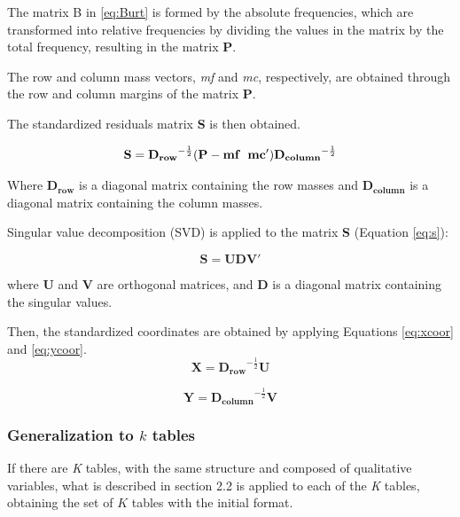 \documentclass[mathematics,article,submit,moreauthors,pdftex]{mdpi}
\begin{document}
The matrix B in \ref{eq:Burt} is formed by the absolute frequencies,
which are transformed into relative frequencies by dividing the values
in the matrix by the total frequency, resulting in the matrix
\textbf{P}.

The row and column mass vectors, \emph{mf} and \emph{mc}, respectively,
are obtained through the row and column margins of the matrix
\textbf{P}.

The standardized residuals matrix \textbf{S} is then obtained.

\begin{equation}
\mathbf{S}=\mathbf{D_{row}}^{-\frac{1}{2}}(\mathbf{P}-\mathbf{mf} \hspace{0.2cm} \mathbf{mc'})\mathbf{D_{column}}^{-\frac{1}{2}}
\label{eq:s}
\end{equation}

Where \(\mathbf{D_{row}}\) is a diagonal matrix containing the row
masses and \(\mathbf{D_{column}}\) is a diagonal matrix containing the
column masses.

Singular value decomposition (SVD) is applied to the matrix \textbf{S}
(Equation \ref{eq:s}):

\begin{equation}
\mathbf{S}=\mathbf{U}\mathbf{D}\mathbf{V'}
\label{eq:svd}
\end{equation}

where \(\mathbf{U}\) and \(\mathbf{V}\) are orthogonal matrices, and
\(\mathbf{D}\) is a diagonal matrix containing the singular values.

Then, the standardized coordinates are obtained by applying Equations
\ref{eq:xcoor} and \ref{eq:ycoor}. \begin{equation}
\mathbf{X}=\mathbf{D_{row}}^{-\frac{1}{2}} \mathbf{U}
\label{eq:xcoor}
\end{equation}

\begin{equation}
\mathbf{Y}=\mathbf{D_{column}}^{-\frac{1}{2}} \mathbf{V}
\label{eq:ycoor}
\end{equation}

\hypertarget{generalization-to-k-tables}{%
\subsubsection{\texorpdfstring{Generalization to \(k\)
tables}{Generalization to k tables}}\label{generalization-to-k-tables}}

If there are \emph{K} tables, with the same structure and composed of
qualitative variables, what is described in section 2.2 is applied to
each of the \emph{K} tables, obtaining the set of \(K\) tables with the
initial format.
\end{document}
